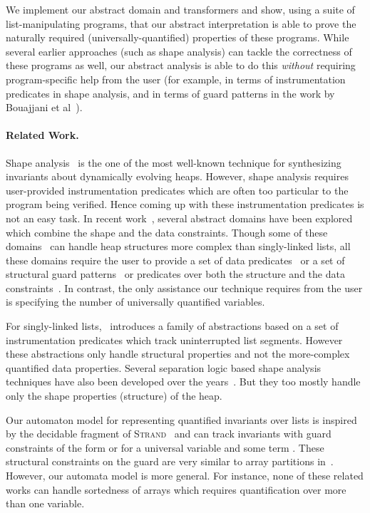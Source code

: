 \documentclass{llncs}
\newcommand{\Strand}{\textsc{Strand}\xspace}
\begin{document}
We implement our abstract domain and transformers and show, using a suite of list-manipulating programs,
that our abstract interpretation is able to prove the naturally required (universally-quantified) properties of these programs.
While
several earlier approaches (such as shape analysis) can tackle the correctness of these programs as well, our abstract
analysis is able to do this \emph{without} requiring program-specific help from the user (for example, in terms of
instrumentation predicates in shape analysis, and in terms of guard patterns in the work by Bouajjani et al~\cite{celia}).

\paragraph{\bf Related Work.}

Shape analysis~\cite{shapeanalysis} is the one of the most well-known technique for synthesizing invariants about dynamically evolving heaps. However, shape analysis requires user-provided instrumentation predicates which are often too particular to the program being verified. Hence coming up with these instrumentation predicates is not an easy task.
In recent work~\cite{sas10,chang-rival,celia,gulwani08}, several abstract domains have been explored which combine the shape and the data constraints.
Though some of these domains~\cite{sas10,chang-rival} can handle heap structures more complex than singly-linked lists, all these domains require the user to provide a set of data predicates~\cite{gulwani08} or a set of structural guard patterns~\cite{celia} or predicates over both the structure and the data constraints~\cite{sas10,chang-rival}.
In contrast, the only assistance our technique requires from the user is specifying the number of universally quantified variables.

For singly-linked lists,~\cite{rama} introduces a family of abstractions based on a set of instrumentation predicates which track uninterrupted list segments. However these abstractions only handle structural properties and not the more-complex quantified data properties.
Several separation logic based shape analysis techniques have also been developed over the years~\cite{distefano,guo,berdine,slayer}. But they too mostly handle only the shape properties (structure) of the heap.



Our automaton model for representing quantified invariants over lists is inspired by the decidable fragment of \Strand~\cite{popl11} and can track invariants with guard constraints of the form  or  for a universal variable  and some term . These structural constraints on the guard are very similar to array partitions in~\cite{gopan,halbwachs-pldi08,cousot-logozzo}. However, our automata model is more general. For instance, none of these related works can handle sortedness of arrays which requires quantification over more than one variable.
\end{document}
